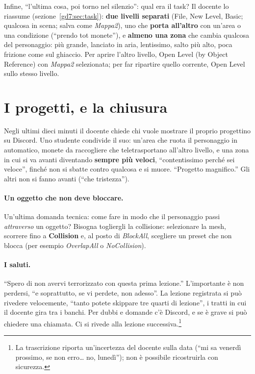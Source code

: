 Infine, ``l'ultima cosa, poi torno nel silenzio'': qual era il task? Il
docente lo riassume (sezione~\ref{gd7:sec:task}): \textbf{due livelli
separati} (File, New Level, Basic; qualcosa in scena; salva come
\emph{Mappa2}), uno che \textbf{porta all'altro} con un'area o una condizione
(``prendo tot monete''), e \textbf{almeno una zona} che cambia qualcosa del
personaggio: più grande, lanciato in aria, lentissimo, salto più alto, poca
frizione come sul ghiaccio. Per aprire l'altro livello, Open Level (by Object
Reference) con \emph{Mappa2} selezionata; per far ripartire quello corrente,
Open Level sullo stesso livello.

\section{I progetti, e la chiusura}
\label{gd7:sec:chiusura}

Negli ultimi dieci minuti il docente chiede chi vuole mostrare il proprio
progettino su Discord. Uno studente condivide il suo: un'area che ruota il
personaggio in automatico, monete da raccogliere che teletrasportano
all'altro livello, e una zona in cui si va avanti diventando \textbf{sempre
più veloci}, ``contentissimo perché sei veloce'', finché non si sbatte contro
qualcosa e si muore. ``Progetto magnifico.'' Gli altri non si fanno avanti
(``che tristezza'').

\paragraph{Un oggetto che non deve bloccare.} Un'ultima domanda tecnica: come
fare in modo che il personaggio passi \emph{attraverso} un oggetto? Bisogna
togliergli la collisione: selezionare la mesh, scorrere fino a
\textbf{Collision} e, al posto di \emph{BlockAll}, scegliere un preset che non
blocca (per esempio \emph{OverlapAll} o \emph{NoCollision}).

\paragraph{I saluti.} ``Spero di non avervi terrorizzato con questa prima
lezione.'' L'importante è non perdersi, ``e soprattutto, se vi perdete, non
adesso''. La lezione registrata si può rivedere velocemente, ``tanto potete
skippare tre quarti di lezione'', i tratti in cui il docente gira tra i
banchi. Per dubbi e domande c'è Discord, e se è grave si può chiedere una
chiamata. Ci si rivede alla lezione successiva.\footnote{La trascrizione
riporta un'incertezza del docente sulla data (``mi sa venerdì prossimo, se non
erro\dots{} no, lunedì''); non è possibile ricostruirla con sicurezza.}

